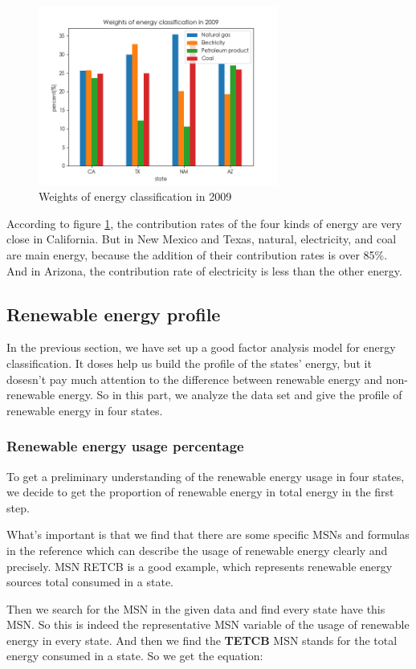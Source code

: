 \documentclass[a4paper,11pt]{article}
\begin{document}
\begin{figure}[H] 
    \centering 
    \includegraphics[width=0.7\textwidth]{./Pic/1-1.png}
    \caption{Weights of energy classification in 2009}
    \label{fig:1-1}
\end{figure}

\par According to figure \ref{fig:1-1}, the contribution rates of the four kinds of energy are very close in California. But in New Mexico and Texas, natural, electricity, and coal are main energy, because the addition of their contribution rates is over 85\%. And in Arizona, the contribution rate of electricity is less than the other energy. 

\subsection{Renewable energy profile}

\par In the previous section, we have set up a good factor analysis model for energy classification. It doses help us build the profile of the states' energy, but it dosesn't pay much attention to the difference between renewable energy and non-renewable energy. So in this part, we analyze the data set and give the profile of renewable energy in four states.

\subsubsection{Renewable energy usage percentage}
\par To get a preliminary understanding of the renewable energy usage in four states, we decide to get the proportion of renewable energy in total energy in the first step.

\par What's important is that we find that there are some specific MSNs and formulas in the reference \cite{4} which can describe the usage of renewable energy clearly and precisely. MSN RETCB is a good example, which represents renewable energy sources total consumed in a state.
\par Then we search for the MSN in the given data and find every state have this MSN. 
So this is indeed the representative MSN variable of the usage of renewable energy in every state. And then we find the \textbf{TETCB} MSN stands for the total energy consumed in a state. So we get the equation:
\end{document}
